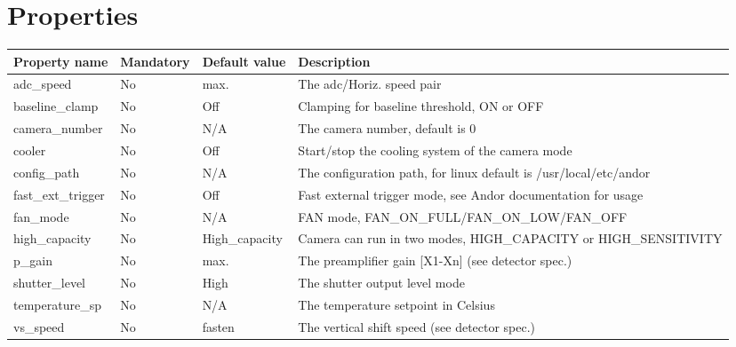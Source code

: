\documentclass[letterpaper,10pt,english]{sphinxmanual}
\begin{document}
\section{Properties}
\label{AndorCCD/andorccd:properties}
\begin{tabulary}{\linewidth}{|L|L|L|L|}
\hline
\textsf{\relax 
Property name
} & \textsf{\relax 
Mandatory
} & \textsf{\relax 
Default value
} & \textsf{\relax 
Description
}\\
\hline
adc\_speed
 & 
No
 & 
max.
 & 
The adc/Horiz. speed pair
\\
\hline
baseline\_clamp
 & 
No
 & 
Off
 & 
Clamping for baseline threshold, ON or OFF
\\
\hline
camera\_number
 & 
No
 & 
N/A
 & 
The camera number,  default is  0
\\
\hline
cooler
 & 
No
 & 
Off
 & 
Start/stop the cooling system of the camera mode
\\
\hline
config\_path
 & 
No
 & 
N/A
 & 
The configuration path, for linux default is /usr/local/etc/andor
\\
\hline
fast\_ext\_trigger
 & 
No
 & 
Off
 & 
Fast external trigger mode, see Andor documentation for usage
\\
\hline
fan\_mode
 & 
No
 & 
N/A
 & 
FAN mode, FAN\_ON\_FULL/FAN\_ON\_LOW/FAN\_OFF
\\
\hline
high\_capacity
 & 
No
 & 
High\_capacity
 & 
Camera can run in two modes, HIGH\_CAPACITY or HIGH\_SENSITIVITY
\\
\hline
p\_gain
 & 
No
 & 
max.
 & 
The preamplifier gain {[}X1-Xn{]} (see detector spec.)
\\
\hline
shutter\_level
 & 
No
 & 
High
 & 
The shutter output level mode
\\
\hline
temperature\_sp
 & 
No
 & 
N/A
 & 
The temperature setpoint in Celsius
\\
\hline
vs\_speed
 & 
No
 & 
fasten
 & 
The vertical shift speed (see detector spec.)
\\
\hline\end{tabulary}
\end{document}
